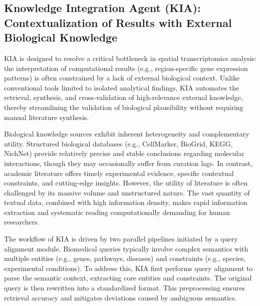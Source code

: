 \documentclass[a4,center,fleqn]{NAR}
\begin{document}
\subsection{Knowledge Integration Agent (KIA): Contextualization of Results with External Biological Knowledge}

KIA is designed to resolve a critical bottleneck in spatial transcriptomics analysis: the interpretation of computational results (e.g., region-specific gene expression patterns) is often constrained by a lack of external biological context. Unlike conventional tools limited to isolated analytical findings, KIA automates the retrieval, synthesis, and cross-validation of high-relevance external knowledge, thereby streamlining the validation of biological plausibility without requiring manual literature synthesis.

Biological knowledge sources exhibit inherent heterogeneity and complementary utility. Structured biological databases (e.g., CellMarker, BioGrid, KEGG, NichNet) provide relatively precise and stable conclusions regarding molecular interactions, though they may occasionally suffer from curation lags. In contrast, academic literature offers timely experimental evidence, specific contextual constraints, and cutting-edge insights. However, the utility of literature is often challenged by its massive volume and unstructured nature. The vast quantity of textual data, combined with high information density, makes rapid information extraction and systematic reading computationally demanding for human researchers.


The workflow of KIA is driven by two parallel pipelines initiated by a query alignment module. Biomedical queries typically involve complex semantics with multiple entities (e.g., genes, pathways, diseases) and constraints (e.g., species, experimental conditions). To address this, KIA first performs query alignment to parse the semantic context, extracting core entities and constraints. The original query is then rewritten into a standardized format. This preprocessing ensures retrieval accuracy and mitigates deviations caused by ambiguous semantics.
\end{document}
